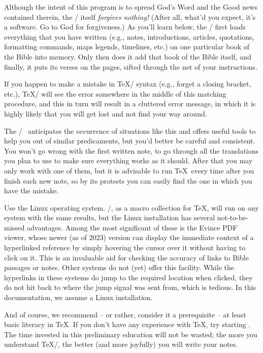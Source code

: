 \watchout
Although the intent of this program is to spread God's Word and the Good news contained therein, the 
\OpBible/ itself {\it forgives nothing!} 
(After all, what'd you expect, it's a software. Go to God for forgiveness.) As you'll learn below, 
the \OpBible/ first loads everything that you have written (e.g., notes, introductions, articles, quotations, 
formatting commands, maps legends, timelines, etc.) on one particular book of the Bible into memory. 
Only then does it add that book of the Bible itself, and finally, it puts its verses on the pages, sifted through the 
net of your instructions.

If you happen to make a mistake in \TeX/ syntax (e.g., forget a closing bracket, etc.), \TeX/ will see the 
error somewhere in the middle of this matching procedure, and this in turn will result in a 
cluttered error message, in which it is highly likely that you will get lost and not find your way 
around.

The \OpBible/~ anticipates the occurrence of situations like this and offers useful tools to help 
you out of similar predicaments, but you'd better be careful and consistent. You won't go wrong with 
the first written note, to go through all the translations you plan to use to make sure everything 
works as it should.  After that you may only  work with one of them, but it is advisable to run 
\TeX\ every time  after you finish each new note, so by its protests  you can easily find the one 
in which you have the mistake.

\recommended Use the Linux operating system. \OpBible/, as a macro collection for \TeX, will run on any 
system with the same results, but the Linux installation has
several not-to-be-missed advantages. Among the most significant of these is the Evince PDF viewer, 
whose newer (as of 2023) version can display the immediate context of a hyperlinked
reference by simply hovering the cursor over it without having to click on it. This is an invaluable 
aid for checking the accuracy of links to Bible passages or notes.
Other systems do not (yet) offer this facility. While the hyperlinks in these systems do jump to the 
required location when clicked, they do not hit back to where the jump signal was sent from, which 
is tedious. In this documentation, we assume a Linux installation.

And of course, we recommend -- or rather, consider it a prerequisite -- at least basic literacy in 
\TeX.
If you don't have any experience with \TeX, try starting 
. 
The time invested in this preliminary education will not be wasted; the more you understand \TeX/, 
the better (and more joyfully) you will write your notes.

